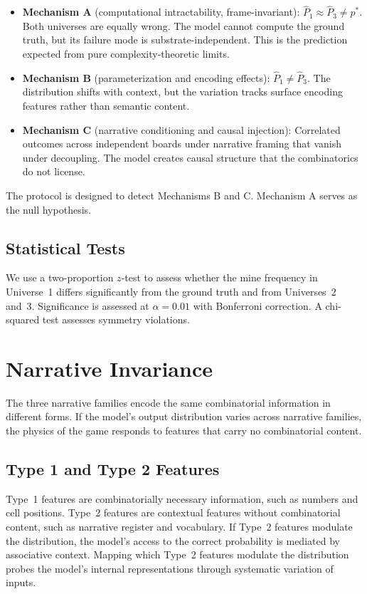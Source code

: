 \documentclass[12pt,a4paper]{article}
\begin{document}
\begin{itemize}[nosep]
    \item \textbf{Mechanism A} (computational intractability, frame-invariant): $\hat{P}_1 \approx \hat{P}_3 \neq p^*$. Both universes are equally wrong. The model cannot compute the ground truth, but its failure mode is substrate-independent. This is the prediction expected from pure complexity-theoretic limits.
    \item \textbf{Mechanism B} (parameterization and encoding effects): $\hat{P}_1 \neq \hat{P}_3$. The distribution shifts with context, but the variation tracks surface encoding features rather than semantic content.
    \item \textbf{Mechanism C} (narrative conditioning and causal injection): Correlated outcomes across independent boards under narrative framing that vanish under decoupling. The model creates causal structure that the combinatorics do not license.
\end{itemize}

The protocol is designed to detect Mechanisms B and C. Mechanism A serves as the null hypothesis.

\subsection{Statistical Tests}
\label{sec:stats}

We use a two-proportion $z$-test to assess whether the mine frequency in Universe~1 differs significantly from the ground truth and from Universes~2 and~3. Significance is assessed at $\alpha = 0.01$ with Bonferroni correction. A chi-squared test assesses symmetry violations.

\section{Narrative Invariance}
\label{sec:narrative}

The three narrative families encode the same combinatorial information in different forms. If the model's output distribution varies across narrative families, the physics of the game responds to features that carry no combinatorial content.

\subsection{Type 1 and Type 2 Features}
\label{sec:type12}

Type~1 features are combinatorially necessary information, such as numbers and cell positions. Type~2 features are contextual features without combinatorial content, such as narrative register and vocabulary. If Type~2 features modulate the distribution, the model's access to the correct probability is mediated by associative context. Mapping which Type~2 features modulate the distribution probes the model's internal representations through systematic variation of inputs.
\end{document}
